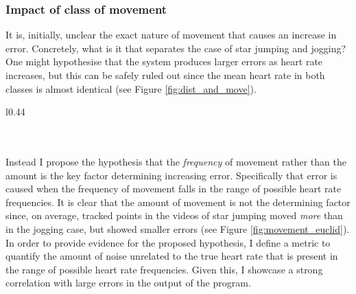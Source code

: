 \subsubsection{Impact of class of movement}
It is, initially, unclear the exact nature of movement that causes an increase in error. Concretely, what is it that separates the case of star jumping and jogging? 
One might hypothesise that the system produces larger errors as heart rate increases, but this can be safely ruled out since the mean heart rate in both classes is almost identical (see Figure \ref{fig:dist_and_move}).
\begin{wrapfigure}{l}{0.44\textwidth}
   \centering 
   \scalebox{0.6}{
   }
   \caption{\textit{Mean Euclidean distance moved by tracked points between frames}}
   \label{fig:movement_euclid}
\end{wrapfigure}
\\\\
Instead I propose the hypothesis that the \textit{frequency} of movement rather than the amount is the key factor determining increasing error. Specifically that error is caused when the frequency of movement
falls in the range of possible heart rate frequencies.
It is clear that the amount of movement is not the determining factor since, on average, tracked points in the videos of star jumping moved \textit{more} than in the jogging case, but showed smaller errors (see Figure \ref{fig:movement_euclid}).
In order to provide evidence for the proposed hypothesis, I define a metric to quantify the amount of noise unrelated to the true heart rate that is present in the range of possible heart rate frequencies.
Given this, I showcase a strong correlation with large errors in the output of the program.



